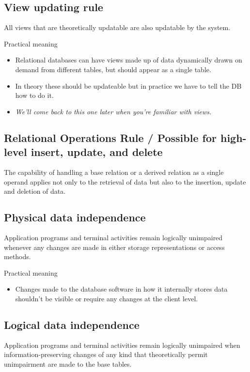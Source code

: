 \documentclass[slides]{pgnotes}
\begin{document}
\subsection{View updating rule}
  All views that are theoretically updatable are also updatable by the system.

  \begin{greenbox}{Practical meaning}
    \begin{itemize}
    \item Relational databases can have views made up of data dynamically drawn on demand from different tables, but should appear as a single table.
    \item In theory these should be updateable but in practice we have to tell the DB how to do it.
    \item \textit{We'll come back to this one later when you're familiar with views.}
    \end{itemize}
  \end{greenbox}
  
\subsection{Relational Operations Rule / Possible for high-level insert, update, and delete}
  The capability of handling a base relation or a derived relation as a single operand applies not only to the retrieval of data but also to the insertion, update and deletion of data.

\subsection{Physical data independence}
  Application programs and terminal activities remain logically unimpaired whenever any changes are made in either storage representations or access methods.

  \begin{greenbox}{Practical meaning}
    \begin{itemize}
    \item Changes made to the database software in how it internally stores data shouldn't be visible or require any changes at the client level.
    \end{itemize}
  \end{greenbox}
  
\subsection{Logical data independence}
Application programs and terminal activities remain logically unimpaired when information-preserving changes of any kind that theoretically permit unimpairment are made to the base tables.
\end{document}
